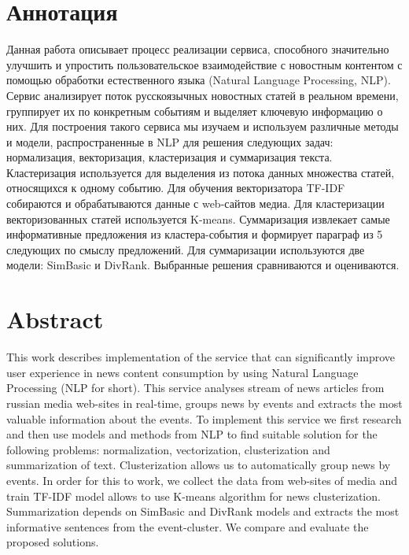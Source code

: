 \titleformat{\section}[block]
{\centering\fontsize{16pt}{18pt}\selectfont\bfseries}{\thesection\cftsecaftersnum}{0.5em}{} %

\section*{Аннотация}
Данная работа описывает процесс реализации сервиса, способного значительно улучшить
и упростить пользовательское взаимодействие с новостным контентом с помощью обработки
естественного языка (Natural Language Processing, NLP). Сервис анализирует поток русскоязычных новостных статей в реальном времени, группирует их по конкретным событиям и выделяет ключевую информацию о них.
Для построения такого сервиса мы изучаем и используем различные методы и модели, распространенные в NLP для решения следующих задач:
нормализация, векторизация, кластеризация и суммаризация текста.
Кластеризация используется для выделения из потока данных множества статей, относящихся к одному событию.
Для обучения векторизатора TF-IDF собираются и обрабатываются данные с web-сайтов медиа. Для кластеризации векторизованных статей используется K-means.
Суммаризация извлекает самые информативные предложения из кластера-события и формирует параграф из 5 следующих по смыслу предложений. Для суммаризации используются две модели: SimBasic и DivRank. Выбранные решения сравниваются и оцениваются.


\section*{Abstract}
This work describes implementation of the service that can significantly improve user experience in news content consumption by using Natural Language Processing (NLP for short). This service analyses stream of news articles from russian media web-sites in real-time, groups news by events and extracts the most valuable information about the events.
To implement this service we first research and then use models and methods from NLP to find suitable solution for the following problems: normalization, vectorization, clusterization and summarization of text.
Clusterization allows us to automatically group news by events. In order for this to work, we collect the data from web-sites of media and train TF-IDF model allows to use K-means algorithm for news clusterization. Summarization depends on SimBasic and DivRank models and extracts the most informative sentences from the event-cluster. We compare and evaluate the proposed solutions.

\titleformat{\section}[block]
{\raggedright\fontsize{16pt}{18pt}\selectfont\bfseries}{\thesection\cftsecaftersnum}{0.5em}{} %